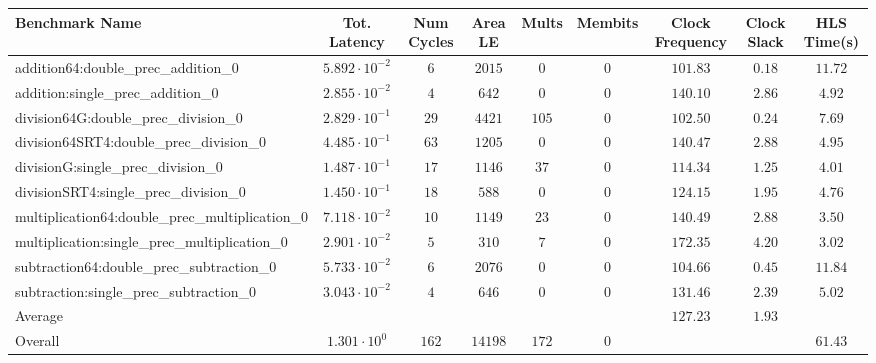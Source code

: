 \begin{tabular}{|l|c|c|c|c|c|c|c|c|}
\hline
Benchmark Name                                   & Tot. Latency            & Num Cycles & Area LE   & Mults   & Membits & Clock Frequency & Clock Slack & HLS Time(s) \\
\hline
addition64:double\_prec\_addition\_0             & $ 5.892 \cdot 10^{-2} $ & $ 6      $ & $ 2015  $ & $ 0   $ & $ 0   $ & $ 101.83      $ & $ 0.18    $ & $ 11.72   $ \\
addition:single\_prec\_addition\_0               & $ 2.855 \cdot 10^{-2} $ & $ 4      $ & $ 642   $ & $ 0   $ & $ 0   $ & $ 140.10      $ & $ 2.86    $ & $ 4.92    $ \\
division64G:double\_prec\_division\_0            & $ 2.829 \cdot 10^{-1} $ & $ 29     $ & $ 4421  $ & $ 105 $ & $ 0   $ & $ 102.50      $ & $ 0.24    $ & $ 7.69    $ \\
division64SRT4:double\_prec\_division\_0         & $ 4.485 \cdot 10^{-1} $ & $ 63     $ & $ 1205  $ & $ 0   $ & $ 0   $ & $ 140.47      $ & $ 2.88    $ & $ 4.95    $ \\
divisionG:single\_prec\_division\_0              & $ 1.487 \cdot 10^{-1} $ & $ 17     $ & $ 1146  $ & $ 37  $ & $ 0   $ & $ 114.34      $ & $ 1.25    $ & $ 4.01    $ \\
divisionSRT4:single\_prec\_division\_0           & $ 1.450 \cdot 10^{-1} $ & $ 18     $ & $ 588   $ & $ 0   $ & $ 0   $ & $ 124.15      $ & $ 1.95    $ & $ 4.76    $ \\
multiplication64:double\_prec\_multiplication\_0 & $ 7.118 \cdot 10^{-2} $ & $ 10     $ & $ 1149  $ & $ 23  $ & $ 0   $ & $ 140.49      $ & $ 2.88    $ & $ 3.50    $ \\
multiplication:single\_prec\_multiplication\_0   & $ 2.901 \cdot 10^{-2} $ & $ 5      $ & $ 310   $ & $ 7   $ & $ 0   $ & $ 172.35      $ & $ 4.20    $ & $ 3.02    $ \\
subtraction64:double\_prec\_subtraction\_0       & $ 5.733 \cdot 10^{-2} $ & $ 6      $ & $ 2076  $ & $ 0   $ & $ 0   $ & $ 104.66      $ & $ 0.45    $ & $ 11.84   $ \\
subtraction:single\_prec\_subtraction\_0         & $ 3.043 \cdot 10^{-2} $ & $ 4      $ & $ 646   $ & $ 0   $ & $ 0   $ & $ 131.46      $ & $ 2.39    $ & $ 5.02    $ \\
\hline
Average                                          & $                     $ & $        $ & $       $ & $     $ & $     $ & $ 127.23      $ & $ 1.93    $ & $         $ \\
\hline
Overall                                          & $ 1.301 \cdot 10^{0}  $ & $ 162    $ & $ 14198 $ & $ 172 $ & $ 0   $ & $             $ & $         $ & $ 61.43   $ \\
\hline
\end{tabular}
